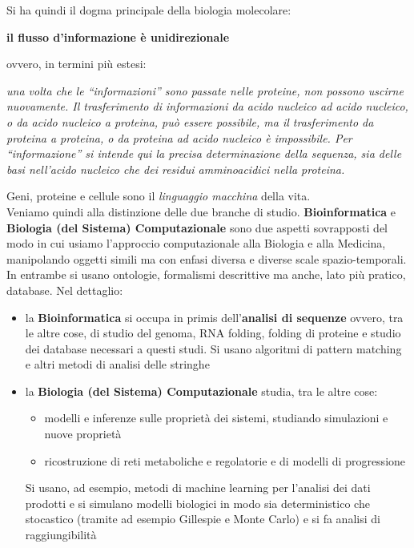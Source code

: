 \documentclass[a4paper,12pt, oneside]{book}
\begin{document}
\begin{teorema}
  Si ha quindi il dogma principale della biologia molecolare:
  \begin{center}
    \textbf{il flusso d'informazione è unidirezionale}
  \end{center}
  ovvero, in termini più estesi:
  \begin{center}
    \emph{una volta che le ``informazioni'' sono passate nelle proteine, non
      possono uscirne nuovamente. Il trasferimento di informazioni da acido
      nucleico ad acido nucleico, o da acido nucleico a proteina, può essere
      possibile, ma il trasferimento da proteina a proteina, o da proteina ad
      acido nucleico è impossibile. Per ``informazione'' si intende qui la
      precisa determinazione della sequenza, sia delle basi nell'acido nucleico
      che dei residui amminoacidici nella proteina.} 
  \end{center}
\end{teorema}
Geni, proteine e cellule sono il \textit{linguaggio macchina} della vita.\\
Veniamo quindi alla distinzione delle due branche di
studio. \textbf{Bioinformatica} e \textbf{Biologia (del Sistema) Computazionale}
sono due aspetti sovrapposti del modo in cui usiamo l'approccio computazionale
alla Biologia e alla Medicina, manipolando oggetti simili ma con enfasi diversa
e diverse scale spazio-temporali. In entrambe si usano ontologie, formalismi
descrittive ma anche, lato più pratico, database. Nel dettaglio:
\begin{itemize}
  \item la \textbf{Bioinformatica} si occupa in primis dell'\textbf{analisi di
    sequenze} ovvero, tra le altre cose, di studio del genoma, RNA folding,
  folding di proteine e studio dei database necessari a questi studi. Si usano
  algoritmi di pattern matching e altri metodi di analisi delle stringhe
  \item la \textbf{Biologia (del Sistema) Computazionale} studia, tra le altre
  cose:
  \begin{itemize}
    \item modelli e inferenze sulle proprietà dei sistemi, studiando simulazioni
    e nuove proprietà
    \item ricostruzione di reti metaboliche e regolatorie e di modelli di
    progressione 
  \end{itemize}
  Si usano, ad esempio, metodi di machine learning per l'analisi dei dati
  prodotti e si simulano modelli biologici in modo sia deterministico che
  stocastico (tramite ad esempio Gillespie e Monte Carlo) e si fa analisi di
  raggiungibilità 
\end{itemize}
\end{document}
